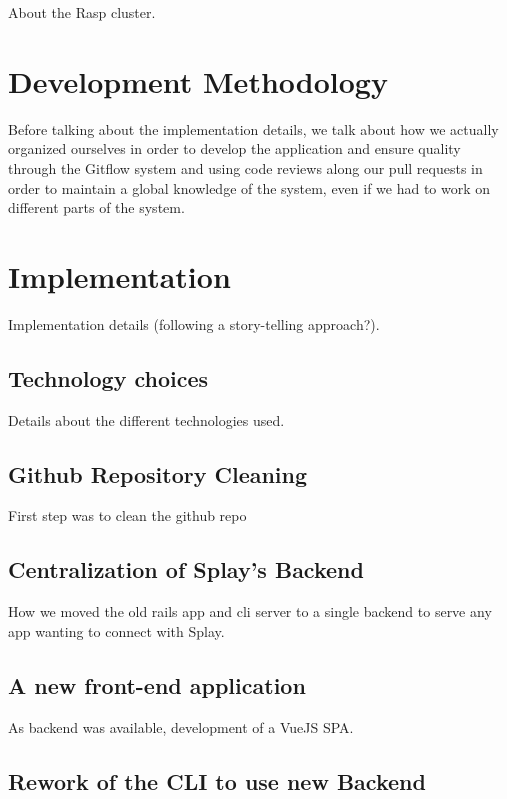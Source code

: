 \documentclass{eplmastersthesis}
\begin{document}
    About the Rasp cluster.

  \chapter{Development Methodology}

    Before talking about the implementation details, we talk about how we actually
    organized ourselves in order to develop the application and ensure quality
    through the Gitflow system and using code reviews along our pull requests
    in order to maintain a global knowledge of the system, even if we had to work
    on different parts of the system.

  \chapter{Implementation}

    Implementation details  (following a story-telling approach?).

    \section{Technology choices}

      Details about the different technologies used.

    \section{Github Repository Cleaning}

      First step was to clean the github repo

    \section{Centralization of Splay's Backend}

      How we moved the old rails app and cli server to a single backend
      to serve any app wanting to connect with Splay.

    \section{A new front-end application}

      As backend was available, development of a VueJS SPA.

    \section{Rework of the CLI to use new Backend}
\end{document}
